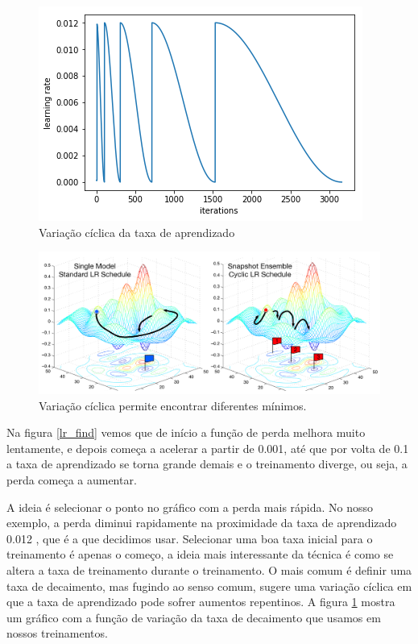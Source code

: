 \documentclass[conference]{IEEEtran}
\begin{document}
\begin{figure}[ht!]
\begin{center}
\includegraphics[width=.55\columnwidth]{cyclical_graph.png}
\caption{Variação cíclica da taxa de aprendizado}
\label{cicle}
\end{center}
\end{figure}

\begin{figure}[ht!]
\begin{center}
\includegraphics[width=\columnwidth]{minimos.png}
\caption{Variação cíclica permite encontrar diferentes mínimos\cite{cyclical}.}
\label{minimos}
\end{center}
\end{figure}

Na figura \ref{lr_find} vemos que de início a função de perda melhora muito lentamente, e depois começa a acelerar a partir de 0.001, até que por volta de 0.1 a taxa de aprendizado se torna grande demais e o treinamento diverge, ou seja, a perda começa a aumentar. 

A ideia é selecionar o ponto no gráfico com a perda mais rápida. No nosso exemplo, a perda diminui rapidamente na proximidade da taxa de aprendizado 0.012 , que é a que decidimos usar. Selecionar uma boa taxa inicial para o treinamento é apenas o começo, a ideia mais interessante da técnica é como se altera a taxa de treinamento durante o treinamento.  O mais comum é definir uma taxa de decaimento, mas fugindo ao senso comum,\cite{cyclical} sugere uma variação cíclica em que a taxa de aprendizado pode sofrer aumentos repentinos. A figura \ref{cicle} mostra um gráfico com a função de variação da taxa de decaimento que usamos em nossos treinamentos.
\end{document}
